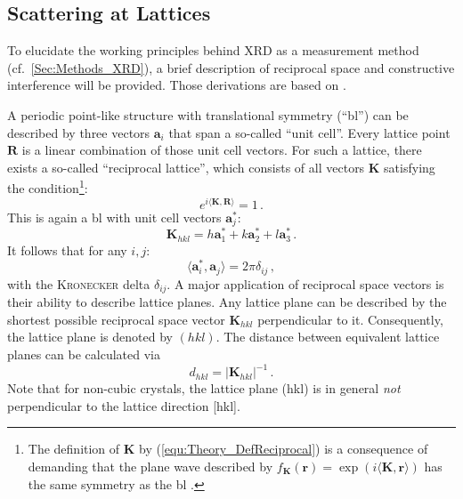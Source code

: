 \subsection{Scattering at Lattices}
To elucidate the working principles behind \gls{XRD} as a measurement method (cf.~\ref{Sec:Methods_XRD}), a brief description of reciprocal space and constructive interference will be provided.
Those derivations are based on \textcite{ashcroft1976}.

A periodic point-like structure with translational symmetry (\enquote{\gls{bl}}) can be described by three vectors $\mathbf{a}_i$ that span a so-called \enquote{unit cell}.
Every lattice point $\mathbf{R}$ is a linear combination of those unit cell vectors.
For such a lattice, there exists a so-called \enquote{reciprocal lattice}, which consists of all vectors $\mathbf{K}$ satisfying the condition\footnote{
    The definition of $\textbf{K}$ by (\ref{equ:Theory_DefReciprocal}) is a consequence of demanding that the plane wave described by $f_\mathbf{K}(\mathbf{r})=\exp(i\langle\mathbf{K},\mathbf{r}\rangle)$ has the same symmetry as the \gls{bl}
        \cite{ashcroft1976}.
}:
\begin{equation}\label{equ:Theory_DefReciprocal}
    e^{i\langle\mathbf{K},\mathbf{R}\rangle}=1\,.
\end{equation}
This is again a \gls{bl} with unit cell vectors $\mathbf{a}_j^*$:
\begin{equation}
    \mathbf{K}_{hkl}=h\mathbf{a}_1^*+k\mathbf{a}_2^*+l\mathbf{a}_3^*\,.
\end{equation}
It follows that for any $i,j$:
\begin{equation}
    \langle\mathbf{a}_i^*,\mathbf{a}_j\rangle=2\pi\delta_{ij}\,,
\end{equation}
with the \textsc{Kronecker} delta $\delta_{ij}$.
A major application of reciprocal space vectors is their ability to describe lattice planes.
Any lattice plane can be described by the shortest possible reciprocal space vector $\mathbf{K}_{hkl}$ perpendicular to it.
Consequently, the lattice plane is denoted by $(hkl)$.
The distance between equivalent lattice planes can be calculated via
\begin{equation}\label{Equ:Theory_planeDistance}
    d_{hkl}=|\mathbf{K}_{hkl}|^{-1}\,.
\end{equation}
Note that for non-cubic crystals, the lattice plane (hkl) is in general \textit{not} perpendicular to the lattice direction [hkl].

